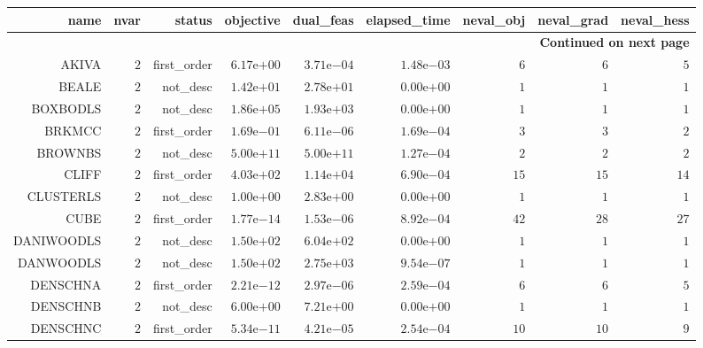 \begin{longtable}{rrrrrrrrr}
\hline
name & nvar & status & objective & dual\_feas & elapsed\_time & neval\_obj & neval\_grad & neval\_hess \\\hline
\endhead
\hline
\multicolumn{9}{r}{{\bfseries Continued on next page}}\\
\hline
\endfoot
\endlastfoot
AKIVA & \(     2\) & first\_order & \( 6.17\)e\(+00\) & \( 3.71\)e\(-04\) & \( 1.48\)e\(-03\) & \(     6\) & \(     6\) & \(     5\) \\
BEALE & \(     2\) & not\_desc & \( 1.42\)e\(+01\) & \( 2.78\)e\(+01\) & \( 0.00\)e\(+00\) & \(     1\) & \(     1\) & \(     1\) \\
BOXBODLS & \(     2\) & not\_desc & \( 1.86\)e\(+05\) & \( 1.93\)e\(+03\) & \( 0.00\)e\(+00\) & \(     1\) & \(     1\) & \(     1\) \\
BRKMCC & \(     2\) & first\_order & \( 1.69\)e\(-01\) & \( 6.11\)e\(-06\) & \( 1.69\)e\(-04\) & \(     3\) & \(     3\) & \(     2\) \\
BROWNBS & \(     2\) & not\_desc & \( 5.00\)e\(+11\) & \( 5.00\)e\(+11\) & \( 1.27\)e\(-04\) & \(     2\) & \(     2\) & \(     2\) \\
CLIFF & \(     2\) & first\_order & \( 4.03\)e\(+02\) & \( 1.14\)e\(+04\) & \( 6.90\)e\(-04\) & \(    15\) & \(    15\) & \(    14\) \\
CLUSTERLS & \(     2\) & not\_desc & \( 1.00\)e\(+00\) & \( 2.83\)e\(+00\) & \( 0.00\)e\(+00\) & \(     1\) & \(     1\) & \(     1\) \\
CUBE & \(     2\) & first\_order & \( 1.77\)e\(-14\) & \( 1.53\)e\(-06\) & \( 8.92\)e\(-04\) & \(    42\) & \(    28\) & \(    27\) \\
DANIWOODLS & \(     2\) & not\_desc & \( 1.50\)e\(+02\) & \( 6.04\)e\(+02\) & \( 0.00\)e\(+00\) & \(     1\) & \(     1\) & \(     1\) \\
DANWOODLS & \(     2\) & not\_desc & \( 1.50\)e\(+02\) & \( 2.75\)e\(+03\) & \( 9.54\)e\(-07\) & \(     1\) & \(     1\) & \(     1\) \\
DENSCHNA & \(     2\) & first\_order & \( 2.21\)e\(-12\) & \( 2.97\)e\(-06\) & \( 2.59\)e\(-04\) & \(     6\) & \(     6\) & \(     5\) \\
DENSCHNB & \(     2\) & not\_desc & \( 6.00\)e\(+00\) & \( 7.21\)e\(+00\) & \( 0.00\)e\(+00\) & \(     1\) & \(     1\) & \(     1\) \\
DENSCHNC & \(     2\) & first\_order & \( 5.34\)e\(-11\) & \( 4.21\)e\(-05\) & \( 2.54\)e\(-04\) & \(    10\) & \(    10\) & \(     9\) \\

\end{longtable}
